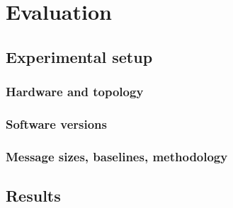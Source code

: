 \chapter{Evaluation}\label{ch:eval}

\section{Experimental setup}
\subsection{Hardware and topology}
\subsection{Software versions}
\subsection{Message sizes, baselines, methodology}
\section{Results}

